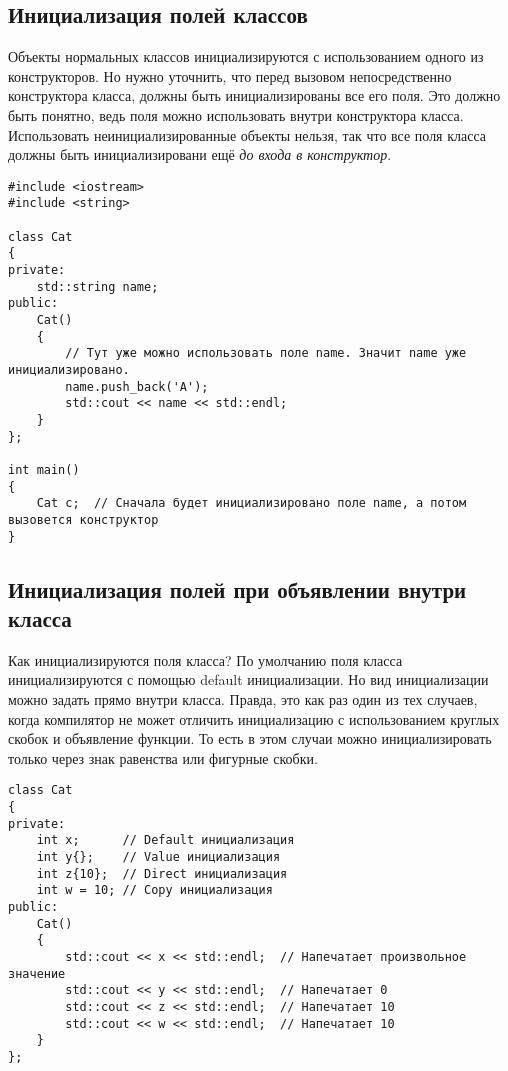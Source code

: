 \documentclass{article}
\begin{document}
\subsection*{Инициализация полей классов}
Объекты нормальных классов инициализируются с использованием одного из конструкторов. Но нужно уточнить, что перед вызовом непосредственно конструктора класса, должны быть инициализированы все его поля. Это должно быть понятно, ведь поля можно использовать внутри конструктора класса. Использовать неинициализированные объекты нельзя, так что все поля класса должны быть инициализировани ещё \textit{до входа в конструктор}.
\begin{lstlisting}
#include <iostream>
#include <string>

class Cat
{
private:
	std::string name;
public:	
	Cat() 
	{
		// Тут уже можно использовать поле name. Значит name уже инициализировано.
		name.push_back('A');
		std::cout << name << std::endl;
	}
};

int main()
{
	Cat c;  // Cначала будет инициализировано поле name, а потом вызовется конструктор
}
\end{lstlisting}

\subsection*{Инициализация полей при объявлении внутри класса}
Как инициализируются поля класса? По умолчанию поля класса инициализируются с помощью default инициализации. Но вид инициализации можно задать прямо внутри класса. Правда, это как раз один из тех случаев, когда компилятор не может отличить инициализацию с использованием круглых скобок и объявление функции. То есть в этом случаи можно инициализировать только через знак равенства или фигурные скобки.
\begin{lstlisting}
class Cat
{
private:
	int x;      // Default инициализация
	int y{};    // Value инициализация
	int z{10};  // Direct инициализация
	int w = 10; // Copy инициализация
public:	
	Cat() 
	{
		std::cout << x << std::endl;  // Напечатает произвольное значение
		std::cout << y << std::endl;  // Напечатает 0
		std::cout << z << std::endl;  // Напечатает 10
		std::cout << w << std::endl;  // Напечатает 10
	}
};
\end{lstlisting}
\end{document}

